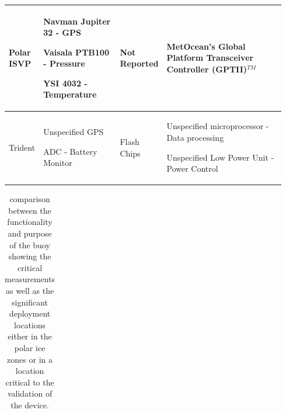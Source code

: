 \begin{longtable}{>{\RaggedRight}m{0.092\linewidth}>{\RaggedRight}m{0.284\linewidth}>{\RaggedRight}m{0.117\linewidth}>{\RaggedRight}m{0.445\linewidth}}
Polar ISVP & Navman Jupiter 32 - GPS\par{}Vaisala PTB100 - Pressure\par{}YSI 4032 - Temperature& Not Reported & MetOcean’s Global Platform Transceiver Controller (GPTII)$^{TM}$\\ \hline
Trident & Unspecified GPS\par{}ADC - Battery Monitor& Flash Chips & Unspecified microprocessor - Data processing\par{}Unspecified Low Power Unit - Power Control \\ \hline
\end{longtable}
\newpage

\begin{center}{
    \setlength{\extrarowheight}{5pt}%
    \begin{longtable}[H]{|>{\RaggedRight}m{}|>{\RaggedRight}m{}|>{\RaggedRight}m{}|}
    \caption{ comparison between the functionality and purpose of the buoy showing the critical measurements as well as the significant deployment locations either in the polar ice zones or in a location critical to the validation of the device.}
    

\end{longtable}}
\end{center}
